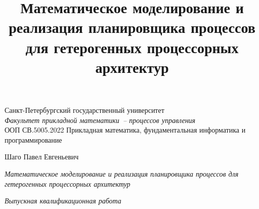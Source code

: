 \documentclass[aspectratio=169,11pt]{beamer}
\title{Математическое моделирование и
        реализация планировщика
процессов для гетерогенных процессорных архитектур}
\begin{document}
\begin{frame}[plain]
        \vspace*{0.3em}
        \begin{center}
                \begin{shadowbox3}[colframe=GrayThr]
                        {\scriptsize
                                Санкт-Петербургский государственный
                                университет \\ [0.1em]
                                \textit{Факультет прикладной математики~-- процессов
                                управления} \\ [-0.4em]
                                ООП СВ.5005.2022 Прикладная
                                математика, фундаментальная информатика и
                                программирование
                        }
                \end{shadowbox3}
        \end{center}

        \vspace{0.1em}
        \noindent\rlap{\hspace*{-1cm}\textcolor{MainRed}{\rule{\paperwidth}{1pt}}}\par
        \vspace{0.4em}

        \begin{center}
                {\small\color{DarkRed}Шаго Павел Евгеньевич}

                \vspace{0.4em}
                \begin{shadowbox3}[colback=MainRed!8]
                        {\color{MainRed}\itshape
                                Математическое моделирование и
                                реализация планировщика
                        процессов для гетерогенных процессорных архитектур}
                \end{shadowbox3}

                \vspace{0.4em}
                {\small\itshape Выпускная квалификационная работа}
        \end{center}
        \vspace{1.1em}


\end{frame}
\end{document}
